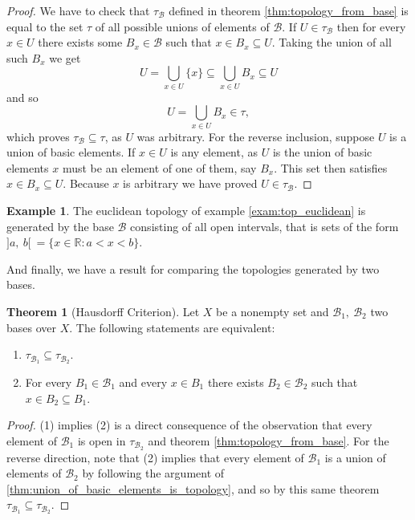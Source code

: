 \documentclass[a4paper]{book}
\theoremstyle{definition}
\newtheorem{theorem}{Theorem}[section]
\theoremstyle{ejemplo}
\newtheorem{example}{Example}[section]
\theoremstyle{demostracion}
\newcommand{\reales}{\mathbb{R}}
\begin{document}
\begin{proof}
	We have to check that $\tau_{\mathcal{B}}$ defined in theorem \eqref{thm:topology_from_base} is equal to the set $\tau$ of all possible unions of elements of $\mathcal{B}$. If $U \in \tau_{\mathcal{B}}$ then for every $x \in U$ there exists some $B_x \in \mathcal{B}$ such that $x \in B_x \subseteq U$. Taking the union of all such $B_x$ we get
	\begin{equation*}
		U = \bigcup_{x \in U} \{ x \} \subseteq \bigcup_{x \in U} B_x \subseteq U
	\end{equation*}
	and so
	\begin{equation*}
		U = \bigcup_{x \in U} B_x \in \tau,
	\end{equation*}
	which proves $\tau_{\mathcal{B}} \subseteq \tau$, as $U$ was arbitrary. For the reverse inclusion, suppose $U$ is a union of basic elements. If $x \in U$ is any element, as $U$ is the union of basic elements $x$ must be an element of one of them, say $B_x$. This set then satisfies $x \in B_x \subseteq U$. Because $x$ is arbitrary we have proved $U \in \tau_{\mathcal{B}}$.
\end{proof}

\begin{example}
	The euclidean topology of example \eqref{exam:top_euclidean} is generated by the base $\mathcal{B}$ consisting of all open intervals, that is sets of the form $]a,\ b[\ = \{ x\in \reales : a < x < b\}$.
\end{example}

And finally, we have a result for comparing the topologies generated by two bases.

\begin{theorem}[Hausdorff Criterion]
	Let $X$ be a nonempty set and $\mathcal{B}_1,\ \mathcal{B}_2$ two bases over $X$. The following statements are equivalent:
	\begin{enumerate}
		\item
		$\tau_{\mathcal{B}_1} \subseteq \tau_{\mathcal{B}_2}$.
		\item
		For every $B_1 \in \mathcal{B}_1$ and every $x \in B_1$ there exists $B_2 \in \mathcal{B}_2$ such that $x \in B_2 \subseteq B_1$.
	\end{enumerate}
\end{theorem}

\begin{proof}
	(1) implies (2) is a direct consequence of the observation that every element of $\mathcal{B}_1$ is open in $\tau_{\mathcal{B}_2}$ and theorem \eqref{thm:topology_from_base}. For the reverse direction, note that (2) implies that every element of $\mathcal{B}_1$ is a union of elements of $\mathcal{B}_2$ by following the argument of \eqref{thm:union_of_basic_elements_is_topology}, and so by this same theorem $\tau_{\mathcal{B}_1} \subseteq \tau_{\mathcal{B}_2}$.
\end{proof}
\end{document}

